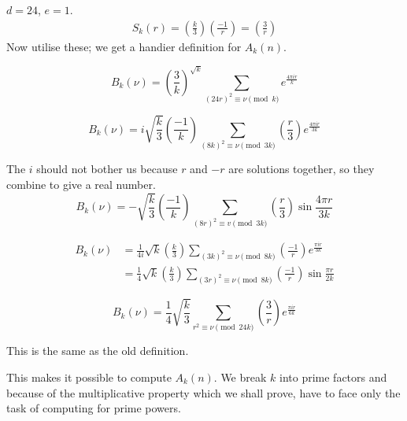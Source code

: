 \begin{case}\label{part3:lec24:case4}
  $d=24$, $e=1$.
  \begin{align*}
    S_k (r) = \left( \frac{k}{3}\right)\left( \frac{-1}{r}\right) =
    \left( \frac{3}{r}\right) 
  \end{align*}
  Now utilise these; we get a handier definition for $A_k (n)$.
\end{case}

\setcounter{case}{0}
\begin{case}
  $$
  B_k (\nu) = \left( \frac{3}{k}\right)^{\sqrt{k}} \sum_{(24 r)^2
    \equiv \nu \pmod{k}} e^{\frac{4 \pi i r}{k}}
  $$
\end{case}

\begin{case}
  $$
  B_k (\nu) = i \sqrt{\frac{k}{3}} \left( \frac{-1}{k}\right)
  \sum_{(8k)^2 \equiv \nu \pmod{3k}} \left( \frac{r}{3}\right)
  e^{\frac{4 \pi i r}{3k}}
  $$
\end{case}

The $i$ should not bother us because $r$ and $-r$ are solutions
together, so they combine to give a real number. 
$$
B_k (\nu) =- \sqrt{\frac{k}{3}} \left( \frac{-1}{k}\right) \sum_{(8
  r)^2 \equiv v \pmod{3k}} \left( \frac{r}{3}\right) \sin \frac{4 \pi
  r}{3k} 
$$

\begin{case}
  \begin{align*}
    B_k (\nu) &= \frac{1}{4i} \sqrt{k} \left( \frac{k}{3}\right)
    \sum_{(3k)^2 \equiv \nu \pmod{8k}} \left( \frac{-1}{r}\right)
    e^{\frac{\pi i r}{3k}}\\
    & = \frac{1}{4} \sqrt{k} \left( \frac{k}{3}\right) \sum_{(3 r)^2
      \equiv \nu \pmod{8k}} \left( \frac{-1}{r}\right) \sin \frac{\pi r}{2k}
  \end{align*}
\end{case}\pageoriginale

\begin{case}
  $$
  B_k (\nu) = \frac{1}{4} \sqrt{\frac{k}{3}} \sum_{r^2 \equiv \nu
    \pmod{24 k}} \left( \frac{3}{r}\right) e^{\frac{\pi i r}{6k}}
  $$
\end{case}

This is the same as the old definition.

This makes it possible to compute $A_k(n)$. We break $k$ into prime
factors and because of the multiplicative property which we shall
prove, have to face only the task of computing for prime powers.



